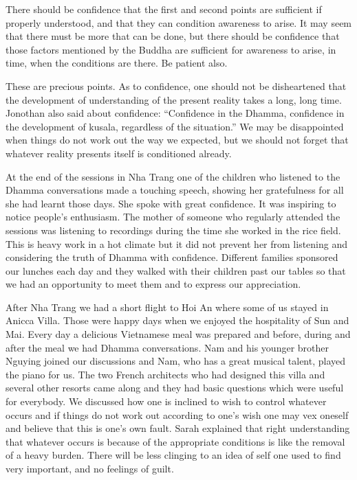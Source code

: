 {There should be confidence that the first and second points
are sufficient if properly understood, and that they can condition
awareness to arise. It may seem that there must be more that can be
done, but there should be confidence that those factors mentioned by the
Buddha are sufficient for awareness to arise, in time, when the
conditions are there. Be patient also.

These are precious points. As to confidence, one should not
be disheartened that the development of understanding of the present
reality takes a long, long time. Jonothan also said about confidence:
``Confidence in the Dhamma, confidence in the development of kusala,
regardless of the situation.'' We may be disappointed when things do not
work out the way we expected, but we should not forget that whatever
reality presents itself is conditioned already. 

At the end of the sessions in Nha Trang one of the children
who listened to the Dhamma conversations made a touching speech, showing
her gratefulness for all she had learnt those days. She spoke with great
confidence. It was inspiring to notice people's enthusiasm. The mother
of someone who regularly attended the sessions was listening to
recordings during the time she worked in the rice field. This is heavy
work in a hot climate but it did not prevent her from listening and
considering the truth of Dhamma with confidence. Different families
sponsored our lunches each day and they walked with their children past
our tables so that we had an opportunity to meet them and to express our
appreciation.

After Nha Trang we had a short flight to Hoi An where some of
us stayed in Anicca Villa. Those were happy days when we enjoyed the
hospitality of Sun and Mai. Every day a delicious Vietnamese meal was
prepared and before, during and after the meal we had Dhamma
conversations. Nam and his younger brother Nguying joined our
discussions and Nam, who has a great musical talent, played the piano
for us. The two French architects who had designed this villa and
several other resorts came along and they had basic questions which were
useful for everybody. We discussed how one is inclined to wish to
control whatever occurs and if things do not work out according to one's
wish one may vex oneself and believe that this is one's own fault. Sarah
explained that right understanding that whatever occurs is because of
the appropriate conditions is like the removal of a heavy burden. There
will be less clinging to an idea of self one used to find very
important, and no feelings of guilt. 

}
